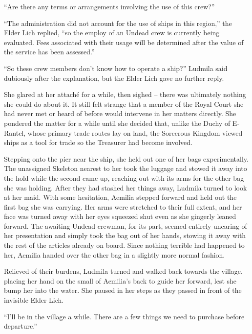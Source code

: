  

“Are there any terms or arrangements involving the use of this crew?”

 

“The administration did not account for the use of ships in this region,” the Elder Lich replied, “so the employ of an Undead crew is currently being evaluated. Fees associated with their usage will be determined after the value of the service has been assessed.”

 

“So these crew members don’t know how to operate a ship?” Ludmila said dubiously after the explanation, but the Elder Lich gave no further reply.

 

She glared at her attaché for a while, then sighed – there was ultimately nothing she could do about it. It still felt strange that a member of the Royal Court she had never met or heard of before would intervene in her matters directly. She pondered the matter for a while until she decided that, unlike the Duchy of E-Rantel, whose primary trade routes lay on land, the Sorcerous Kingdom viewed ships as a tool for trade so the Treasurer had become involved.

 

Stepping onto the pier near the ship, she held out one of her bags experimentally. The unassigned Skeleton nearest to her took the luggage and stowed it away into the hold while the second came up, reaching out with its arms for the other bag she was holding. After they had stashed her things away, Ludmila turned to look at her maid. With some hesitation, Aemilia stepped forward and held out the first bag she was carrying. Her arms were stretched to their full extent, and her face was turned away with her eyes squeezed shut even as she gingerly leaned forward. The awaiting Undead crewman, for its part, seemed entirely uncaring of her presentation and simply took the bag out of her hands, stowing it away with the rest of the articles already on board. Since nothing terrible had happened to her, Aemilia handed over the other bag in a slightly more normal fashion.

 

Relieved of their burdens, Ludmila turned and walked back towards the village, placing her hand on the small of Aemilia’s back to guide her forward, lest she bump her into the water. She paused in her steps as they passed in front of the invisible Elder Lich.

 

“I’ll be in the village a while. There are a few things we need to purchase before departure.”
